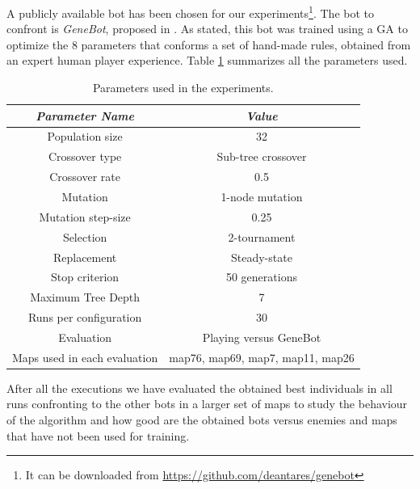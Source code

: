 \documentclass[preprint]{elsarticle}
\begin{document}
A publicly available bot has been chosen for our experiments\footnote{It can be downloaded from \url{https://github.com/deantares/genebot}}. The bot to confront is {\em GeneBot}, proposed in \cite{Genebot_CEC11}. As stated, this bot was trained using a GA to optimize the 8 parameters that conforms a set of hand-made rules, obtained from an expert human player experience.  Table \ref{tab:parameters} summarizes all the parameters used.

\begin{table}
\begin{center}
\begin{tabular}{|c|c|}
\hline
{\em Parameter Name} & {\em Value} \\\hline \hline
Population size & 32 \\\hline
Crossover type & Sub-tree crossover \\ \hline
Crossover rate & 0.5\\ \hline
Mutation  & 1-node mutation\\ \hline
Mutation step-size & 0.25 \\ \hline
Selection & 2-tournament \\ \hline
Replacement & Steady-state\\ \hline
Stop criterion & 50 generations \\ \hline
Maximum Tree Depth & 7  \\ \hline %
Runs per configuration & 30 \\ \hline
Evaluation & Playing versus GeneBot \cite{Genebot_CEC11}  \\ \hline 
Maps used in each evaluation & map76, map69, map7, map11, map26 
\\ \hline
\end{tabular}
\caption{Parameters used in the experiments.}
\label{tab:parameters}
\end{center}
\end{table}

 

After all the executions we have evaluated the obtained best individuals in all runs confronting to the other bots in a larger set of maps to study the behaviour of the algorithm and how good are the obtained bots versus enemies and maps that have not been used for training.
\end{document}
